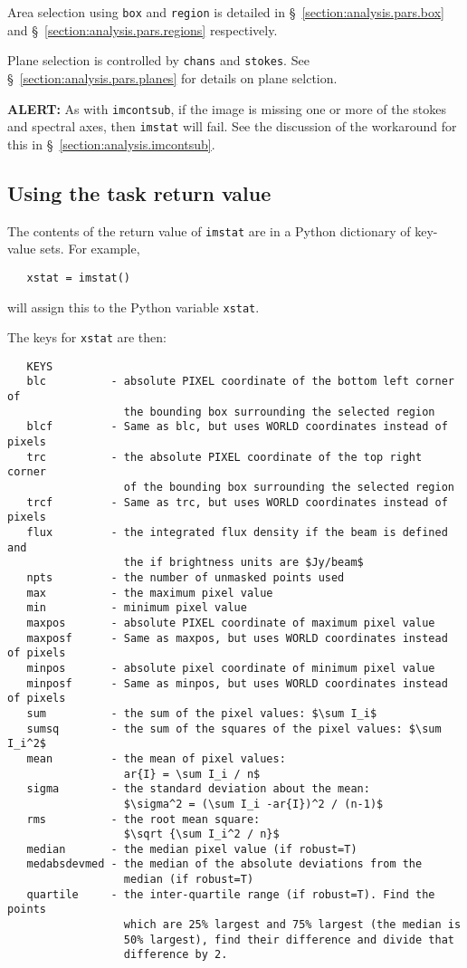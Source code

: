 Area selection using {\tt box} and {\tt region} is detailed in 
\S~\ref{section:analysis.pars.box} and
\S~\ref{section:analysis.pars.regions} respectively.

Plane selection is controlled by {\tt chans} and {\tt stokes}.
See \S~\ref{section:analysis.pars.planes} for details on plane
selction.

{\bf ALERT:} As with {\tt imcontsub}, if the image is missing one
or more of the stokes and spectral axes, then {\tt imstat} will fail.  
See the discussion of the workaround for this in
\S~\ref{section:analysis.imcontsub}.

\subsection{Using the task return value}
\label{section:analysis.imstat.xstat}

The contents of the return value of {\tt imstat} are in a Python
dictionary of key-value sets.  For example,
\small
\begin{verbatim}
   xstat = imstat()
\end{verbatim}
\normalsize
will assign this to the Python variable {\tt xstat}.

The keys for {\tt xstat} are then:
\small
\begin{verbatim}
   KEYS
   blc          - absolute PIXEL coordinate of the bottom left corner of 
                  the bounding box surrounding the selected region
   blcf         - Same as blc, but uses WORLD coordinates instead of pixels
   trc          - the absolute PIXEL coordinate of the top right corner 
                  of the bounding box surrounding the selected region
   trcf         - Same as trc, but uses WORLD coordinates instead of pixels
   flux         - the integrated flux density if the beam is defined and 
                  the if brightness units are $Jy/beam$
   npts         - the number of unmasked points used
   max          - the maximum pixel value
   min          - minimum pixel value
   maxpos       - absolute PIXEL coordinate of maximum pixel value
   maxposf      - Same as maxpos, but uses WORLD coordinates instead of pixels
   minpos       - absolute pixel coordinate of minimum pixel value
   minposf      - Same as minpos, but uses WORLD coordinates instead of pixels
   sum          - the sum of the pixel values: $\sum I_i$
   sumsq        - the sum of the squares of the pixel values: $\sum I_i^2$
   mean         - the mean of pixel values: 
                  ar{I} = \sum I_i / n$
   sigma        - the standard deviation about the mean: 
                  $\sigma^2 = (\sum I_i -ar{I})^2 / (n-1)$
   rms          - the root mean square: 
                  $\sqrt {\sum I_i^2 / n}$
   median       - the median pixel value (if robust=T)
   medabsdevmed - the median of the absolute deviations from the 
                  median (if robust=T)    
   quartile     - the inter-quartile range (if robust=T). Find the points 
                  which are 25% largest and 75% largest (the median is 
                  50% largest), find their difference and divide that 
                  difference by 2.
\end{verbatim}
\normalsize

